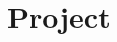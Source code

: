 \documentclass{amsart}
\DeclareMathOperator{\MF}{\sf{MF}}
\DeclareMathOperator{\cost}{\rm{cost}}
\DeclareMathOperator{\dist}{\rm{dist}}
\begin{document}
\newpage

\section{Project}

%	
%	
%	
%	
%	
%	
\end{document}
